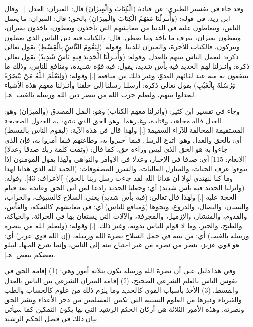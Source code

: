 وقد جاء في تفسير الطبري: عن قتادة (الْكِتَابَ وَالْمِيزَانَ) قال: الميزان: العدل [.] وقال ابن زيد، في قوله: (وَأَنـزلْنَا مَعَهُمُ الْكِتَابَ وَالْمِيزَانَ) بالحق؛ قال: الميزان: ما يعمل الناس، ويتعاطون عليه في الدنيا من معايشهم التي يأخذون ويعطون، يأخذون بميزان، ويعطون بميزان، يعرف ما يأخذ وما يعطي. قال: والكتاب فيه دين الناس الذي يعملون ويتركون، فالكتاب للآخرة، والميزان للدنيا. وقوله: (لِيَقُومَ النَّاسُ بِالْقِسْطِ) يقول تعالى ذكره: ليعمل الناس بينهم بالعدل. وقوله: (وَأَنـزلْنَا الْحَدِيدَ فِيهِ بَأْسٌ شَدِيدٌ) يقول تعالى ذكره: وأنـزلنا لهم الحديد فيه بأس شديد، يقول: فيه قوّة شديدة، ومنافع للناس، وذلك ما ينتفعون به منه عند لقائهم العدوّ، وغير ذلك من منافعه [.] وقوله: (وَلِيَعْلَمَ اللَّهُ مَنْ يَنْصُرُهُ وَرُسُلَهُ بِالْغَيْبِ) يقول تعالى ذكره: أرسلنا رسلنا إلى خلقنا وأنـزلنا معهم هذه الأشياء ليعدلوا بينهم، وليعلم حزب الله من ينصر دين الله ورسله بالغيب [هـ]. 

وجاء في تفسير ابن كثير: (وأنزلنا معهم الكتاب) وهو: النقل المصدق (والميزان) وهو: العدل قاله مجاهد، وقتادة، وغيرهما. وهو الحق الذي تشهد به العقول الصحيحة المستقيمة المخالفة للآراء السقيمة [.] ولهذا قال في هذه الآية: (ليقوم الناس بالقسط) أي: بالحق والعدل وهو: اتباع الرسل فيما أخبروا به، وطاعتهم فيما أمروا به، فإن الذي جاءوا به هو الحق الذي ليس وراءه حق، كما قال: (وتمت كلمة ربك صدقا وعدلا) [الأنعام: 115] أي: صدقا في الإخبار، وعدلا في الأوامر والنواهي \.ولهذا يقول المؤمنون إذا تبوءوا غرف الجنات، والمنازل العاليات، والسرر المصفوفات: (الحمد لله الذي هدانا لهذا وما كنا لنهتدي لولا أن هدانا الله لقد جاءت رسل ربنا بالحق) [الأعراف: 43]. وقوله: (وأنزلنا الحديد فيه بأس شديد) أي: وجعلنا الحديد رادعا لمن أبى الحق وعانده بعد قيام الحجة عليه [.] ولهذا قال تعالى: (فيه بأس شديد) يعني: السلاح كالسيوف، والحراب، والسنان، والنصال، والدروع، ونحوها \.(ومنافع للناس) أي: في معايشهم كالسكة، والفأس، والقدوم، والمنشار، والإزميل، والمجرفة، والآلات التي يستعان بها في الحراثة، والحياكة، والطبخ، والخبز، وما لا قوام للناس بدونه، وغير ذلك. [.] وقوله: (وليعلم الله من ينصره ورسله بالغيب) أي: من نيته في حمل السلاح نصرة الله ورسله، (إن الله قوي عزيز) أي: هو قوي عزيز، ينصر من نصره من غير احتياج منه إلى الناس، وإنما شرع الجهاد ليبلو بعضكم ببعض [هـ].

 وفي هذا دليل على أن نصرة الله ورسله تكون بثلاثة أمور وهي: (1) إقامة الحق في نفوس الناس بالعلم الشرعي الصحيح، (2) إقامة الميزان الشرعي بين الناس بالعدل والقسط، (3) الأخذ بأسباب القوى كالحديد وما يلزم ذلك من علوم كالحساب والطب والفيزياء وغيرها من العلوم السببية التي تكمن المسلمين من دحر الأعداء ونشر الحق ونصرته. وهذه الأمور الثلاثة هي أركان الحكم الرشيد التي بها يكون التمكين كما سيأتي بيان ذلك في فصل الحكم الرشيد.

